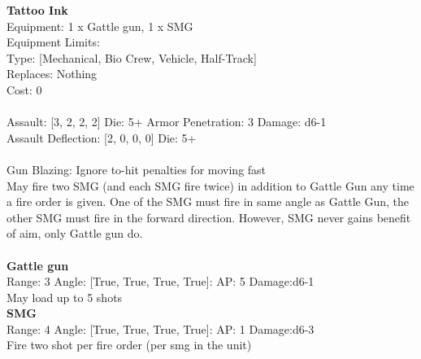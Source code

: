 {\bf Tattoo Ink } \\
Equipment: 1 x Gattle gun, 1 x SMG \\
Equipment Limits:  \\
Type: [Mechanical, Bio Crew, Vehicle, Half-Track] \\
Replaces: Nothing \\
Cost: 0\\
\ \\
Assault: [3, 2, 2, 2] Die: 5+ Armor Penetration: 3 Damage: d6-1 \\
Assault Deflection: [2, 0, 0, 0] Die: 5+\\
\indent  
\ \\
Gun Blazing: Ignore to-hit penalties for moving fast\\ 
May fire two SMG (and each SMG fire twice) in addition to Gattle Gun any time a fire order is given. One of the SMG must fire in same angle as Gattle Gun, the other SMG must fire in the forward direction. However, SMG never gains benefit of aim, only Gattle gun do.\\ 

\ \\
{\bf Gattle gun } \\



Range: 3  Angle: [True, True, True, True]: AP: 5 Damage:d6-1 \\
May load up to 5 shots\\ 




{\bf SMG } \\



Range: 4  Angle: [True, True, True, True]: AP: 1 Damage:d6-3 \\
Fire two shot per fire order (per smg in the unit)\\ 




 
\ \\



